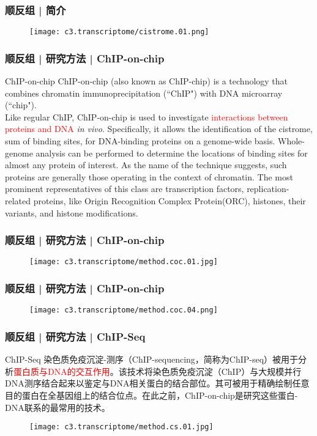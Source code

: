 \begin{frame}
  \frametitle{顺反组 | 简介}
  \begin{figure}
    \centering
    \texttt{[image: c3.transcriptome/cistrome.01.png]}
  \end{figure}
\end{frame}

\begin{frame}
  \frametitle{顺反组 | 研究方法 | ChIP-on-chip}
  \begin{block}{ChIP-on-chip}
    ChIP-on-chip (also known as ChIP-chip) is a technology that combines chromatin immunoprecipitation (``ChIP") with DNA microarray (``chip").\\
    \vspace{1em}
    Like regular ChIP, ChIP-on-chip is used to investigate \textcolor{red}{interactions between proteins and DNA} \textit{in vivo}. Specifically, it allows the identification of the cistrome, sum of binding sites, for DNA-binding proteins on a genome-wide basis. Whole-genome analysis can be performed to determine the locations of binding sites for almost any protein of interest. As the name of the technique suggests, such proteins are generally those operating in the context of chromatin. The most prominent representatives of this class are transcription factors, replication-related proteins, like Origin Recognition Complex Protein(ORC), histones, their variants, and histone modifications.
  \end{block}
\end{frame}

\begin{frame}
  \frametitle{顺反组 | 研究方法 | ChIP-on-chip}
  \begin{figure}
    \centering
    \texttt{[image: c3.transcriptome/method.coc.01.jpg]}
  \end{figure}
\end{frame}

\begin{frame}
  \frametitle{顺反组 | 研究方法 | ChIP-on-chip}
  \begin{figure}
    \centering
    \texttt{[image: c3.transcriptome/method.coc.04.png]}
  \end{figure}
\end{frame}

\begin{frame}
  \frametitle{顺反组 | 研究方法 | ChIP-Seq}
  {\footnotesize
  \begin{block}{ChIP-Seq}
    染色质免疫沉淀-测序（ChIP-sequencing，简称为ChIP-seq）被用于分析\textcolor{red}{蛋白质与DNA的交互作用}。该技术将染色质免疫沉淀（ChIP）与大规模并行DNA测序结合起来以鉴定与DNA相关蛋白的结合部位。其可被用于精确绘制任意目的蛋白在全基因组上的结合位点。在此之前，ChIP-on-chip是研究这些蛋白-DNA联系的最常用的技术。
  \end{block}
  }
  \begin{figure}
    \centering
    \texttt{[image: c3.transcriptome/method.cs.01.jpg]}
  \end{figure}
\end{frame}

